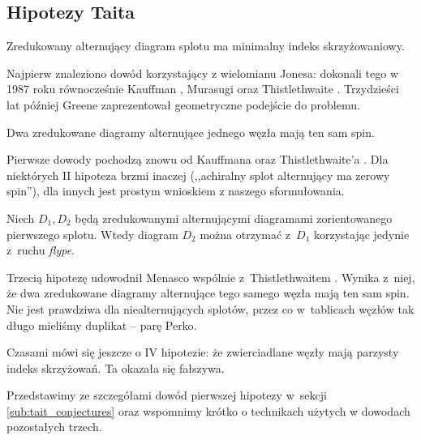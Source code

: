 
\subsection{Hipotezy Taita}
%

\begin{conjecture}
%
\label{con:tait_1}%
    Zredukowany alternujący diagram splotu ma minimalny indeks skrzyżowaniowy.
\end{conjecture}

Najpierw znaleziono dowód korzystający z wielomianu Jonesa: dokonali tego w 1987 roku równocześnie Kauffman \cite{kauffman87}, Murasugi \cite{murasugi87} oraz Thistlethwaite \cite{thistlethwaite87}.
%
%
%
Trzydzieści lat później Greene \cite{greene17} zaprezentował geometryczne podejście do problemu.
%

\begin{conjecture}
%
    Dwa zredukowane diagramy alternujące jednego węzła mają ten sam spin.
\end{conjecture}

Pierwsze dowody pochodzą znowu od Kauffmana \cite{kauffman87} oraz Thistlethwaite'a \cite{thistlethwaite87}.
%
%
Dla niektórych II hipoteza brzmi inaczej (,,achiralny splot alternujący ma zerowy spin''), dla innych jest prostym wnioskiem z naszego sformułowania.

\begin{conjecture}
%
    Niech $D_1, D_2$ będą zredukowanymi alternującymi diagramami zorientowanego pierwszego splotu.
    Wtedy diagram $D_2$ można otrzymać z~$D_1$ korzystając jedynie z~ruchu \emph{flype}.
\end{conjecture}

Trzecią hipotezę udowodnił Menasco wspólnie z~Thistlethwaitem \cite{menasco93}.
%
%
Wynika z~niej, że dwa zredukowane diagramy alternujące tego samego węzła mają ten sam spin.
Nie jest prawdziwa dla niealternujących splotów, przez co w~tablicach węzłów tak długo mieliśmy duplikat -- parę Perko.
%

Czasami mówi się jeszcze o IV hipotezie: że zwierciadlane węzły mają parzysty indeks skrzyżowań.
Ta okazała się fałszywa.

Przedstawimy ze szczegółami dowód pierwszej hipotezy w~sekcji \ref{sub:tait_conjectures} oraz wspomnimy krótko o technikach użytych w dowodach pozostałych trzech.

%


